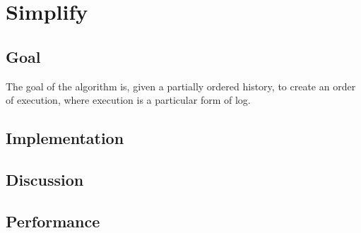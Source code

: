 \section{Simplify}
\subsection{Goal} %
The goal of the algorithm is, given a partially ordered history, to create an order of execution, where execution is a particular form of log.

\subsection{Implementation} %
\subsection{Discussion} %
\subsection{Performance} %

